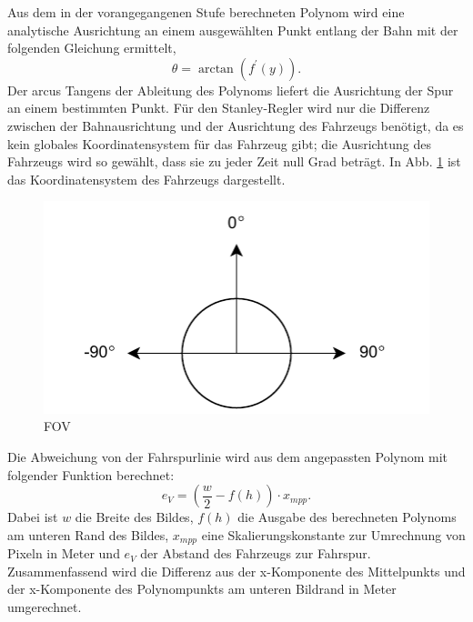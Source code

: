 \documentclass[arbeit=studie,oneside,BCOR=12mm]{ArbeitRST}
\begin{document}
Aus dem in der vorangegangenen Stufe berechneten Polynom wird eine
analytische Ausrichtung an einem ausgewählten Punkt entlang der Bahn mit der
folgenden Gleichung ermittelt, 
\begin{equation} 
    \theta = \arctan(f^\prime(y)).
\end{equation} 
Der arcus Tangens der Ableitung des Polynoms liefert die
Ausrichtung der Spur an einem bestimmten Punkt. Für den Stanley-Regler wird nur die
Differenz zwischen der Bahnausrichtung und der Ausrichtung des Fahrzeugs
benötigt, da es kein globales Koordinatensystem für das Fahrzeug gibt; die
Ausrichtung des Fahrzeugs wird so gewählt, dass sie zu jeder Zeit null Grad
beträgt. In Abb. \ref{ausrichtung} ist das Koordinatensystem des Fahrzeugs
dargestellt. 

\begin{figure}[h]
    \centering
    \includegraphics{fov}
    \caption{FOV}
    \label{ausrichtung}
\end{figure}

Die Abweichung von der Fahrspurlinie wird aus dem angepassten Polynom mit
folgender Funktion berechnet: 
\begin{equation}
    e_{V} = (\frac{w}{2} - f(h))\cdot x_{mpp}.
\end{equation}
Dabei ist $w$ die Breite des Bildes, $f(h)$ die Ausgabe des berechneten
Polynoms am unteren Rand des Bildes, $x_{mpp}$ eine Skalierungskonstante zur
Umrechnung von Pixeln in Meter und $e_{V}$ der Abstand des Fahrzeugs zur
Fahrspur. Zusammenfassend wird die Differenz aus der x-Komponente des
Mittelpunkts und der x-Komponente des Polynompunkts am unteren Bildrand in
Meter umgerechnet.
\end{document}
